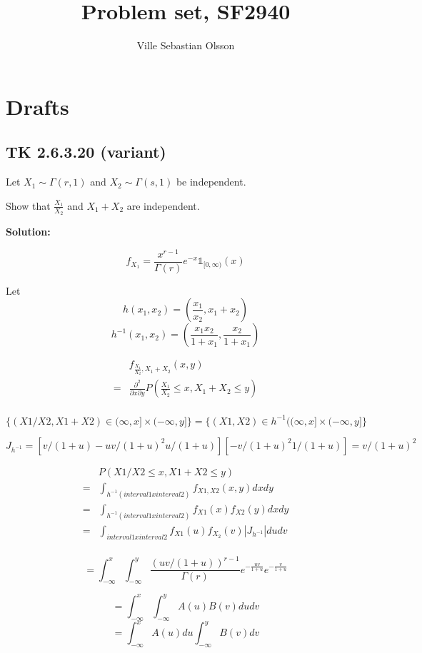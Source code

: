 \documentclass{article}
\title{Problem set, SF2940}
\author{Ville Sebastian Olsson}
\begin{document}
\maketitle
\tableofcontents

\section{Drafts}

\subsection{TK 2.6.3.20 (variant)}
Let $X_1 \sim \Gamma(r, 1)$ and $X_2 \sim \Gamma(s, 1)$ be independent.

Show that $\frac{X_1}{X_2}$ and $X_1 + X_2$ are independent.

\textbf{Solution:}

\[f_{X_1} = \frac{x^{r-1}}{\Gamma(r)}e^{-x} \mathds{1}_{[0,\infty)}(x) \]

Let
\[h(x_1, x_2) = (\frac{x_1}{x_2},x_1+x_2)\]
\[h^{-1}(x_1, x_2) = (\frac{x_1x_2}{1+x_1},\frac{x_2}{1+x_1})\]

\begin{align*}
     & f_{\frac{X_1}{X_2},X_1+X_2}(x,y) \\
    =& \frac{\partial^2}{\partial x \partial y} P(\frac{X_1}{X_2}\leq x,X_1+X_2\leq y) \\
\end{align*}

$$
\{(X1/X2, X1+X2) \in (\infty,x] \times (-\infty,y] \}
= \{(X1, X2) \in h^{-1}((\infty,x] \times (-\infty,y] \}
$$

\[J_{h^{-1}} = [v/(1+u)-uv/(1+u)^2 u/(1+u)] [-v/(1+u)^2 1/(1+u)] = v/(1+u)^2 \]

\begin{align*}
     &P(X1/X2 \leq x, X1+X2 \leq y) \\
    =& \int_{h^{-1}(interval1 x interval 2)} f_{X1,X2}(x,y)dxdy \\
    =& \int_{h^{-1}(interval1 x interval 2)} f_{X1}(x) f_{X2}(y)dxdy \\
    =& \int_{interval1 x interval 2} f_{X1}(u)f_{X_2}(v)|J_{h^{-1}}|dudv \\
\end{align*}

\[ = \int_{-\infty}^x \int_{-\infty}^y \frac{(uv/(1+u))^{r-1}}{\Gamma(r)} e^{-\frac{uv}{1+u}} e^{-\frac{v}{1+u}}\]

\[ = \int_{-\infty}^x \int_{-\infty}^y A(u) B(v) du dv\]
\[ = \int_{-\infty}^x A(u) du \int_{-\infty}^y B(v) dv\]
\end{document}
